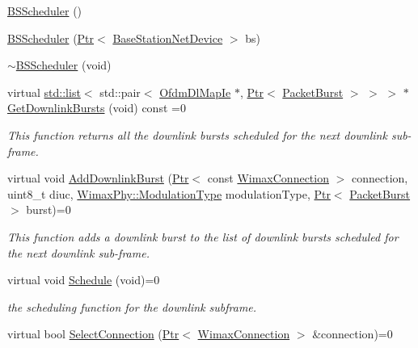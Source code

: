 \begin{DoxyCompactItemize}
\item 
\hyperlink{classns3_1_1BSScheduler_ac7707cac4a7ad79e52777a4f557a38b8}{B\+S\+Scheduler} ()
\item 
\hyperlink{classns3_1_1BSScheduler_a015215cdd10fc7d874c0755c0fdda5de}{B\+S\+Scheduler} (\hyperlink{classns3_1_1Ptr}{Ptr}$<$ \hyperlink{classns3_1_1BaseStationNetDevice}{Base\+Station\+Net\+Device} $>$ bs)
\item 
\hyperlink{classns3_1_1BSScheduler_a38a34a29421e6bd3b06131cd3b5d3485}{$\sim$\+B\+S\+Scheduler} (void)
\item 
virtual \hyperlink{openflow-interface_8h_afd9bcfa176617760671b67580f536fa7}{std\+::list}$<$ std\+::pair$<$ \hyperlink{classns3_1_1OfdmDlMapIe}{Ofdm\+Dl\+Map\+Ie} $\ast$, \hyperlink{classns3_1_1Ptr}{Ptr}$<$ \hyperlink{classns3_1_1PacketBurst}{Packet\+Burst} $>$ $>$ $>$ $\ast$ \hyperlink{classns3_1_1BSScheduler_aa6ac8560e2e7d0e59a9a011f3845cf51}{Get\+Downlink\+Bursts} (void) const =0
\begin{DoxyCompactList}\small\item\em This function returns all the downlink bursts scheduled for the next downlink sub-\/frame. \end{DoxyCompactList}\item 
virtual void \hyperlink{classns3_1_1BSScheduler_aa36179c8d9bcfcbd4de08bdccb6e904d}{Add\+Downlink\+Burst} (\hyperlink{classns3_1_1Ptr}{Ptr}$<$ const \hyperlink{classns3_1_1WimaxConnection}{Wimax\+Connection} $>$ connection, uint8\+\_\+t diuc, \hyperlink{classns3_1_1WimaxPhy_a044c5d8a48ca992c39c2a946f6e755fa}{Wimax\+Phy\+::\+Modulation\+Type} modulation\+Type, \hyperlink{classns3_1_1Ptr}{Ptr}$<$ \hyperlink{classns3_1_1PacketBurst}{Packet\+Burst} $>$ burst)=0
\begin{DoxyCompactList}\small\item\em This function adds a downlink burst to the list of downlink bursts scheduled for the next downlink sub-\/frame. \end{DoxyCompactList}\item 
virtual void \hyperlink{classns3_1_1BSScheduler_aa7d20dff6d4b4f18cb328b448bb7226f}{Schedule} (void)=0
\begin{DoxyCompactList}\small\item\em the scheduling function for the downlink subframe. \end{DoxyCompactList}\item 
virtual bool \hyperlink{classns3_1_1BSScheduler_a6e5f509fe55afd1500909c980e17f4fa}{Select\+Connection} (\hyperlink{classns3_1_1Ptr}{Ptr}$<$ \hyperlink{classns3_1_1WimaxConnection}{Wimax\+Connection} $>$ \&connection)=0

\end{DoxyCompactItemize}
